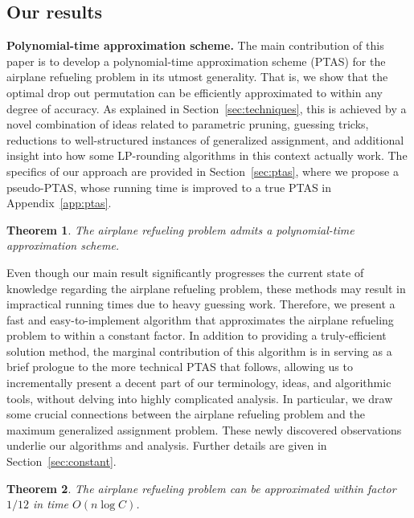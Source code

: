 \documentclass[11pt]{article}
\theoremstyle{plain}
\newtheorem{theorem}{Theorem}[section]
\theoremstyle{definition}
\newcommand{\bs}[1]{\boldsymbol{#1}}
\begin{document}
\subsection{Our results} \label{subsec:results}

{\bf Polynomial-time approximation scheme.} The main contribution of this paper is to develop a polynomial-time approximation scheme (PTAS) for the airplane refueling problem in its utmost generality. That is, we show that the optimal drop out permutation can be efficiently approximated to within any degree of accuracy. As explained in Section~\ref{sec:techniques}, this is achieved by a novel combination of ideas related to parametric pruning, guessing tricks, reductions to well-structured instances of generalized assignment, and additional insight into how some LP-rounding algorithms in this context actually work. The specifics of our approach are provided in Section~\ref{sec:ptas}, where we propose a pseudo-PTAS, whose running time is improved to a true PTAS in Appendix~\ref{app:ptas}.

\begin{theorem} \label{thm:ptas}
The airplane refueling problem admits a polynomial-time approximation scheme.
\end{theorem}

\noindent {\bf Fast $\bs{\Omega(1)}$-approximation.} Even though our main result significantly progresses the current state of knowledge regarding the airplane refueling problem, these methods may result in impractical running times due to heavy guessing work. Therefore, we present a fast and easy-to-implement algorithm that approximates the airplane refueling problem to within a constant factor. In addition to providing a truly-efficient solution method, the marginal contribution of this algorithm is in serving as a brief prologue to the more technical PTAS that follows, allowing us to incrementally present a decent part of our terminology, ideas, and algorithmic tools, without delving into highly complicated analysis. In particular, we 
draw some crucial connections between the airplane refueling problem and the maximum generalized assignment problem. These newly discovered observations underlie our algorithms and analysis. Further details are given in Section~\ref{sec:constant}.

\begin{theorem} \label{thm:constant_approx}
The airplane refueling problem can be approximated within factor~$1/12$ in time $O(n \log C)$.
\end{theorem}
\end{document}
